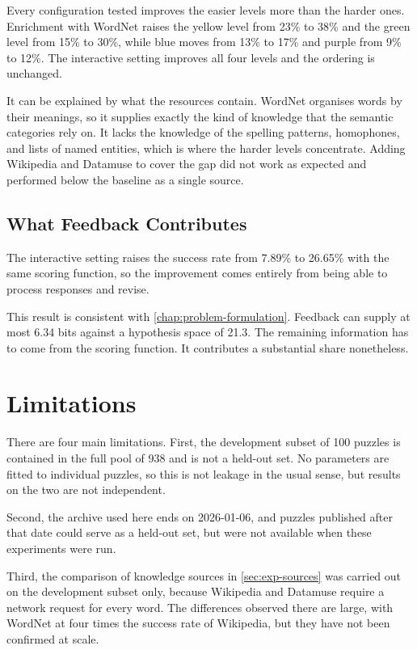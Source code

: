 Every configuration tested improves the easier levels more than the harder ones. Enrichment with WordNet raises the yellow level from 23\% to 38\% and the green level from 15\% to 30\%, while blue moves from 13\% to 17\% and purple from 9\% to 12\%. The interactive setting improves all four levels and the ordering is unchanged.
 
It can be explained by what the resources contain. WordNet organises words by their meanings, so it supplies exactly the kind of knowledge that the semantic categories rely on. It lacks the knowledge of the spelling patterns, homophones, and lists of named entities, which is where the harder levels concentrate. Adding Wikipedia and Datamuse to cover the gap did not work as expected and performed below the baseline as a single source.

\subsection*{What Feedback Contributes}

The interactive setting raises the success rate from 7.89\% to 26.65\% with the same scoring function, so the improvement comes entirely from being able to process responses and revise.
 
This result is consistent with \autoref{chap:problem-formulation}. Feedback can supply at most 6.34 bits against a hypothesis space of 21.3. The remaining information has to come from the scoring function. It contributes a substantial share nonetheless.

\section{Limitations}
\label{sec:limitations}

There are four main limitations. First, the development subset of 100 puzzles is contained in the full pool of 938 and is not a held-out set. No parameters are fitted to individual puzzles, so this is not leakage in the usual sense, but results on the two are not independent.

Second, the archive used here ends on 2026-01-06, and puzzles published after that date could serve as a held-out set, but were not available when these experiments were run.

Third, the comparison of knowledge sources in \autoref{sec:exp-sources} was carried out on the development subset only, because Wikipedia and Datamuse require a network request for every word. The differences observed there are large, with WordNet at four times the success rate of Wikipedia, but they have not been confirmed at scale.

